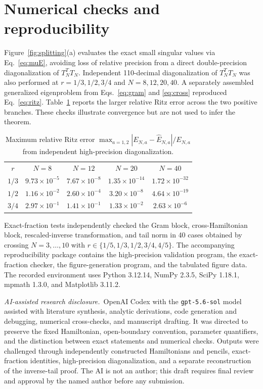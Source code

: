 \documentclass[aps,prb,reprint,superscriptaddress,longbibliography]{revtex4-2}
\begin{document}
\section{Numerical checks and reproducibility}
\label{sec:numerics}

Figure~\ref{fig:splitting}(a) evaluates the exact small singular values via
Eq.~\eqref{eq:muE}, avoiding loss of relative precision from a direct
double-precision diagonalization of $T_N^TT_N$.  Independent 110-decimal
diagonalization of $T_N^TT_N$ was also performed at
$r=1/3,1/2,3/4$ and $N=8,12,20,40$.  A separately assembled generalized
eigenproblem from Eqs.~\eqref{eq:gram} and \eqref{eq:cross} reproduced
Eq.~\eqref{eq:ritz}.  Table~\ref{tab:checks} reports the larger relative Ritz
error across the two positive branches.  These checks illustrate convergence
but are not used to infer the theorem.

\begin{table}[b]
\caption{Maximum relative Ritz error
$\max_{a=1,2}|E_{N,a}-\widehat E_{N,a}|/E_{N,a}$ from independent
high-precision diagonalization.}
\label{tab:checks}
\begin{ruledtabular}
\begin{tabular}{ccccc}
$r$ & $N=8$ & $N=12$ & $N=20$ & $N=40$\\
\colrule
$1/3$ & $9.73\!\times\!10^{-5}$ & $7.67\!\times\!10^{-8}$ & $1.35\!\times\!10^{-14}$ & $1.72\!\times\!10^{-32}$\\
$1/2$ & $1.16\!\times\!10^{-2}$ & $2.60\!\times\!10^{-4}$ & $3.20\!\times\!10^{-8}$ & $4.64\!\times\!10^{-19}$\\
$3/4$ & $2.97\!\times\!10^{-1}$ & $1.41\!\times\!10^{-1}$ & $1.33\!\times\!10^{-2}$ & $2.63\!\times\!10^{-6}$\\
\end{tabular}
\end{ruledtabular}
\end{table}

Exact-fraction tests independently checked the Gram block, cross-Hamiltonian
block, rescaled-inverse transformation, and tail norm in 40 cases obtained by
crossing $N=3,\ldots,10$ with
$r\in\{1/5,1/3,1/2,3/4,4/5\}$.  The accompanying reproducibility package
contains the high-precision validation program, the exact-fraction checker,
the figure-generation program, and the tabulated figure data.  The recorded
environment uses Python 3.12.14, NumPy 2.3.5, SciPy 1.18.1, mpmath 1.3.0, and
Matplotlib 3.11.2.

\smallskip\noindent\textit{AI-assisted research disclosure.}\ 
OpenAI Codex with the \texttt{gpt-5.6-sol} model assisted with literature
synthesis, analytic derivations, code generation and debugging, numerical
cross-checks, and manuscript drafting.  It was directed to preserve the
fixed Hamiltonian, open-boundary convention, parameter quantifiers, and the
distinction between exact statements and numerical checks.  Outputs were
challenged through independently constructed Hamiltonians and pencils,
exact-fraction identities, high-precision diagonalization, and a separate
reconstruction of the inverse-tail proof.  The AI is not an author; this
draft requires final review and approval by the named author before any
submission.
\end{document}
